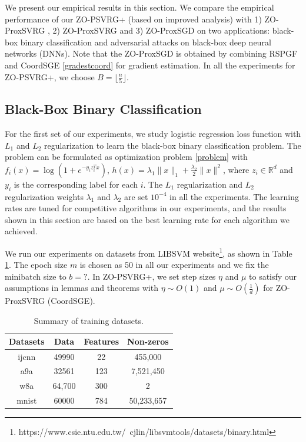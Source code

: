 \documentclass{article}
\newcommand*{\R}{\mathbb{R}}
\theoremstyle{definition}
\theoremstyle{remark}
\begin{document}
We present our empirical results in this section. We compare the empirical performance of
our ZO-PSVRG+ (based on improved analysis) with 1) ZO-ProxSVRG \cite{Johnson12}, 2) ZO-ProxSVRG\cite{pedregosa2017breaking} and 3) ZO-ProxSGD on two applications: black-box binary classification and adversarial attacks on black-box deep neural networks
(DNNs). Note that the ZO-ProxSGD is obtained by combining RSPGF and CoordSGE \eqref{gradestcoord} for gradient estimation. In all the experiments for ZO-PSVRG+, we choose $B = \lfloor{\frac{n}{5}}\rfloor$.

\subsection{Black-Box Binary Classification}
For the first set of our experiments, we study logistic regression loss function with $L_1$ and $L_2$ regularization {\color{Green} to learn the black-box binary classification problem}. The problem can be formulated as optimization problem \eqref{problem} with $f_i(x) = \log(1+e^{-y_iz^T_i{x}})$, $h(x) = \lambda_1\|{x}\|_1 + \frac{\lambda_2}{2}\|{x}\|^2$, where $z_i\in\R^d$ and $y_i$ is the corresponding label for each $i$. The $L_1$ regularization and $L_2$ regularization weights $\lambda_1$ and $\lambda_2$ are set {\color{red} $10^{-4}$} in all the experiments. The learning rates are tuned for competitive algorithms in our experiments, and the results shown in this section are based on the best learning rate for each algorithm we achieved.


We run our experiments on datasets from LIBSVM website{\footnote{https://www.csie.ntu.edu.tw/~cjlin/libsvmtools/datasets/binary.html}}, as shown in Table \ref{metadata}. The epoch size $m$ is chosen as {\color{red} 50} in all our experiments {\color{red} and we fix the minibatch size to $b = ?$}. In ZO-PSVRG+, we set step sizes $\eta$ and $\mu$ to satisfy our assumptions in lemmas and theorems with $\eta\sim O(1)$ and $\mu\sim O(\frac{1}{d})$ for ZO-ProxSVRG (CoordSGE).

\begin{table}[htbp]
\begin{center}
\caption{Summary of training datasets.}
\begin{tabular}{ c|c|c|c } 
 \hline
 Datasets &  Data & Features & Non-zeros \\ 
 \hline
  ijcnn & 49990 & 22 &  455,000\\
  a9a & 32561 & 123 & 7,521,450\\ 
 w8a & 64,700  & 300 & 2 \\ 
 mnist & 60000 & 784 &  50,233,657\\
 \hline
\end{tabular}
\label{metadata}
\end{center}
\end{table}
\end{document}
